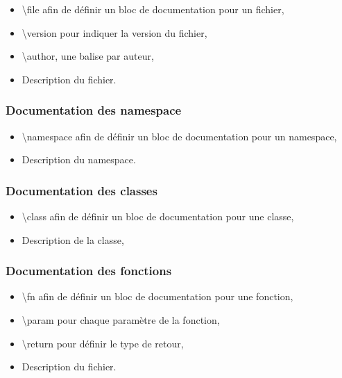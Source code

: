 \begin{itemize}[label=\textbullet]
  \item \textbackslash file afin de définir un bloc de documentation pour un fichier,
  \item \textbackslash version pour indiquer la version du fichier,
  \item \textbackslash author, une balise par auteur,
  \item Description du fichier.
\end{itemize}

\subsubsection{Documentation des namespace}

\begin{itemize}[label=\textbullet]
  \item \textbackslash namespace afin de définir un bloc de documentation pour un namespace,
  \item Description du namespace.
\end{itemize}

\subsubsection{Documentation des classes}

\begin{itemize}[label=\textbullet]
  \item \textbackslash class afin de définir un bloc de documentation pour une classe,
  \item Description de la classe,
\end{itemize}

\subsubsection{Documentation des fonctions}

\begin{itemize}[label=\textbullet]
  \item \textbackslash fn afin de définir un bloc de documentation pour une fonction,
  \item \textbackslash param pour chaque paramètre de la fonction,
  \item \textbackslash return pour définir le type de retour,
  \item Description du fichier.
\end{itemize}
